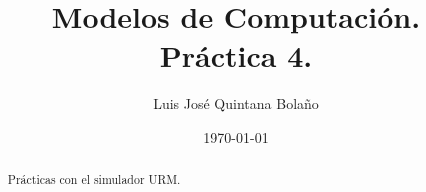 \documentclass[a4paper]{article}
\title{Modelos de Computación.\\ Práctica 4. }
\author{Luis José Quintana Bolaño}
\date{\today}
\begin{document}
		\maketitle
		\begin{abstract}
		    Prácticas con el simulador URM.
  		\end{abstract}
		
		
		
  		
  		
  		
  		
  		
\end{document}
